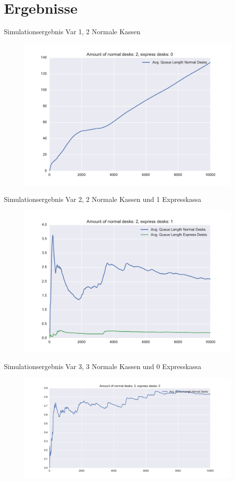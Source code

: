 \section{Ergebnisse}
\begin{frame}[fragile]{Simulationsergebnis Var 1, 2 Normale Kassen}
    	\begin{figure}[h!]
    	\includegraphics[scale=0.5]{BSP30_Plot_1.pdf}
		\end{figure}
\end{frame}

\begin{frame}[fragile]{Simulationsergebnis Var 2, 2 Normale Kassen und 1 Expresskassa}
    	\begin{figure}[h!]
    	\includegraphics[scale=0.5]{BSP30_Plot_2.pdf}
		\end{figure}
\end{frame}

\begin{frame}[fragile]{Simulationsergebnis Var 3, 3 Normale Kassen und 0 Expresskassa}
    	\begin{figure}[h!]
    	\includegraphics[scale=0.4]{BSP30_Plot_3.pdf}
		\end{figure}
\end{frame}


